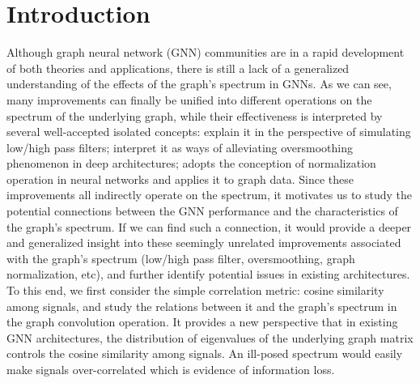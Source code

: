 \documentclass[nohyperref]{article}
\theoremstyle{plain}
\theoremstyle{definition}
\theoremstyle{remark}
\begin{document}
\section{Introduction}
Although graph neural network (GNN) communities are in a rapid development of both theories and applications, there is still a lack of a generalized understanding of the effects of the graph's spectrum in GNNs. As we can see, many improvements can finally be unified into different operations on the spectrum of the underlying graph, while their effectiveness is interpreted by several well-accepted isolated concepts: \cite{pmlr-v97-wu19e,zhu2021interpreting,klicpera_predict_2019,klicpera2019diffusion,chien2021adaptive,balcilar2021analyzing} explain it in the perspective of simulating low/high pass filters; \cite{chenWHDL2020gcnii,xu2018representation,liu2020towards,li2018deeper} interpret it as ways of alleviating oversmoothing phenomenon in deep architectures; \cite{cai2020graphnorm} adopts the conception of normalization operation in neural networks and applies it to graph data.
Since these improvements all indirectly operate on the spectrum,
it motivates us to study the potential connections between the GNN performance and the characteristics of the graph's spectrum. If we can find such a connection, it would provide a deeper and generalized insight into these seemingly unrelated improvements associated with the graph's spectrum (low/high pass filter, oversmoothing, graph normalization, etc), and further identify potential issues in existing architectures.
To this end, we first consider the simple correlation metric: cosine similarity among signals, and study the relations between it and the graph's spectrum in the graph convolution operation. It provides a new perspective that in existing GNN architectures, the distribution of eigenvalues of the underlying graph matrix controls the cosine similarity among signals. An ill-posed  spectrum would easily make signals over-correlated which is evidence of information loss.
\end{document}
